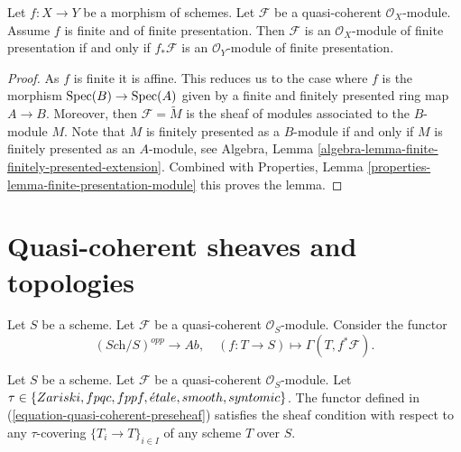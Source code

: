 \begin{lemma}
\label{lemma-finite-finitely-presented-module}
Let $f : X \to Y$ be a morphism of schemes.
Let $\mathcal{F}$ be a quasi-coherent $\mathcal{O}_X$-module.
Assume $f$ is finite and of finite presentation.
Then $\mathcal{F}$ is an $\mathcal{O}_X$-module of finite presentation
if and only if $f_*\mathcal{F}$ is an $\mathcal{O}_Y$-module of finite
presentation.
\end{lemma}

\begin{proof}
As $f$ is finite it is affine. This reduces us to the case where
$f$ is the morphism $\mathop{\rm Spec}(B) \to \mathop{\rm Spec}(A)$ given
by a finite and finitely presented ring map $A \to B$.
Moreover, then $\mathcal{F} = \widetilde{M}$ is the sheaf of modules
associated to the $B$-module $M$.
Note that $M$ is finitely presented as a $B$-module if and only if
$M$ is finitely presented as an $A$-module, see
Algebra, Lemma \ref{algebra-lemma-finite-finitely-presented-extension}.
Combined with
Properties, Lemma \ref{properties-lemma-finite-presentation-module}
this proves the lemma.
\end{proof}
















\section{Quasi-coherent sheaves and topologies}
\label{section-quasi-coherent-sheaves}


\noindent
Let $S$ be a scheme.
Let $\mathcal{F}$ be a quasi-coherent $\mathcal{O}_S$-module.
Consider the functor
\begin{equation}
\label{equation-quasi-coherent-preseheaf}
(\textit{Sch}/S)^{opp} \longrightarrow \textit{Ab},
\quad
(f : T \to S) \longmapsto \Gamma(T, f^*\mathcal{F}).
\end{equation}

\begin{lemma}
\label{lemma-sheaf-condition-holds}
Let $S$ be a scheme.
Let $\mathcal{F}$ be a quasi-coherent $\mathcal{O}_S$-module.
Let $\tau \in \{Zariski,\linebreak[0] fpqc,\linebreak[0] fppf,\linebreak[0]
\acute{e}tale,\linebreak[0] smooth,\linebreak[0] syntomic\}$.
The functor defined in (\ref{equation-quasi-coherent-preseheaf})
satisfies the sheaf condition with respect to any $\tau$-covering
$\{T_i \to T\}_{i \in I}$ of any scheme $T$ over $S$.
\end{lemma}

